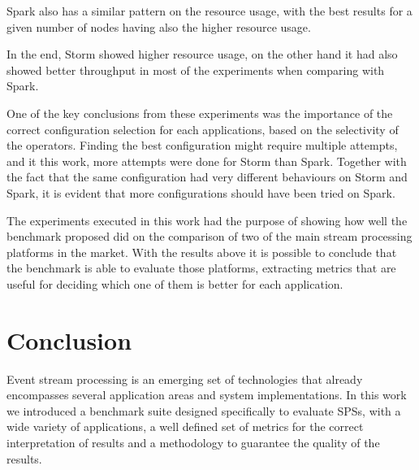 \documentclass[ppgc,diss,english]{iiufrgs}
\begin{document}
Spark also has a similar pattern on the resource usage, with the best results for a given number of nodes having also the higher resource usage.

In the end, Storm showed higher resource usage, on the other hand it had also showed better throughput in most of the experiments when comparing with Spark.

One of the key conclusions from these experiments was the importance of the correct configuration selection for each applications, based on the selectivity of the operators. Finding the best configuration might require multiple attempts, and it this work, more attempts were done for Storm than Spark. Together with the fact that the same configuration had very different behaviours on Storm and Spark, it is evident that more configurations should have been tried on Spark.

The experiments executed in this work had the purpose of showing how well the benchmark proposed did on the comparison of two of the main stream processing platforms in the market. With the results above it is possible to conclude that the benchmark is able to evaluate those platforms, extracting metrics that are useful for deciding which one of them is better for each application.










\chapter{Conclusion}
\label{chapter:conclusion}

Event stream processing is an emerging set of technologies that already encompasses several application areas and system implementations. In this work we introduced a benchmark suite designed specifically to evaluate SPSs, with a wide variety of applications, a well defined set of metrics for the correct interpretation of results and a methodology to guarantee the quality of the results.
\end{document}
